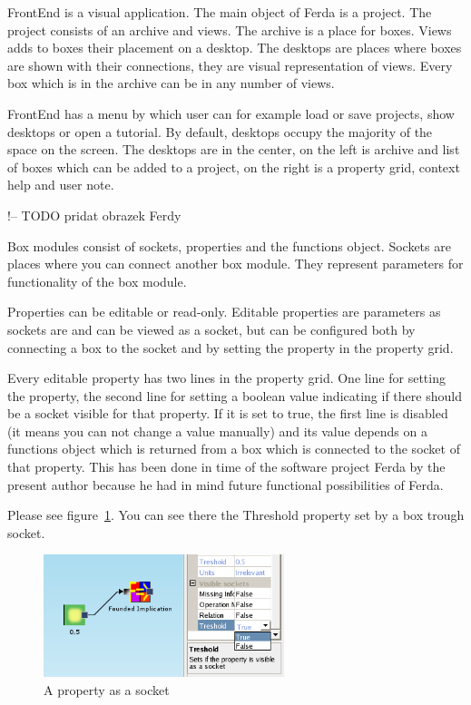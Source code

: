 \documentclass[a4paper,12pt]{book}
\begin{document}
FrontEnd is a visual application. The main object of Ferda is a project. The project consists of an archive and views. The archive is a place for boxes. Views adds to boxes their placement on a desktop. The desktops are places where boxes are shown with their connections, they are visual representation of views. Every box which is in the archive can be in any number of views.

FrontEnd has a menu by which user can for example load or save projects, show desktops or open a tutorial. By default, desktops occupy the majority of the space on the screen. The desktops are in the center, on the left is archive and list of boxes which can be added to a project, on the right is a property grid, context help and user note.

!-- TODO pridat obrazek Ferdy 

Box modules consist of sockets, properties and the functions object. Sockets are places where you can connect another box module. They represent parameters for functionality of the box module.

Properties can be editable or read-only. Editable properties are parameters as sockets are and can be viewed as a socket, but can be configured both by connecting a box to the socket and by setting the property in the property grid.

Every editable property has two lines in the property grid. One line for setting the property, the second line for setting a boolean value indicating if there should be a socket visible for that property. If it is set to true, the first line is disabled (it means you can not change a value manually) and its value depends on a functions object which is returned from a box which is connected to the socket of that property. This has been done in time of the software project Ferda by the present author because he had in mind future functional possibilities of Ferda.

Please see figure~\ref{fig:propertyAsASocket}. You can see there the Threshold property set by a box trough socket.

\begin{figure}
	\centering
	\includegraphics[width=7cm]{property_as_socket}
	\caption{A property as a socket}
	\label{fig:propertyAsASocket}
\end{figure}
\end{document}
